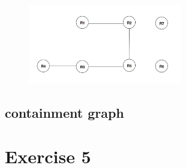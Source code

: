 \documentclass[]{article}
\begin{document}
\begin{figure}[H]
	\begin{center}
		\includegraphics[width=0.6\textwidth]{overlap_graph.png}
	\end{center}
\end{figure}

\subsection{containment graph}


\section{Exercise 5}
\end{document}
